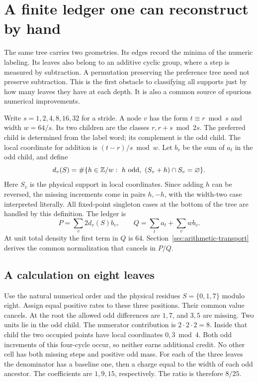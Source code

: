 \section{A finite ledger one can reconstruct by hand}
\label{sec:ledger}
The same tree carries two geometries. Its edges record the minima of the numeric labeling. Its leaves also belong to an additive cyclic group, where a step is measured by subtraction. A permutation preserving the preference tree need not preserve subtraction. This is the first obstacle to classifying all supports just by how many leaves they have at each depth. It is also a common source of spurious numerical improvements.

Write \(s=1,2,4,8,16,32\) for a stride. A node \(v\) has the form \(t\equiv r\bmod s\) and width \(w=64/s\). Its two children are the classes \(r,r+s\bmod 2s\). The preferred child is determined from the label word; its complement is the odd child. The local coordinate for addition is \((t-r)/s\bmod w\). Let \(b_v\) be the sum of \(a_t\) in the odd child, and define
\[
 d_v(S)=\#\{h\in\mathbb Z/w:\ h\ {\rm odd},\
                 (S_v+h)\cap S_v=\varnothing\}.
\]
Here \(S_v\) is the physical support in local coordinates. Since adding \(h\) can be reversed, the missing increments come in pairs \(h,-h\), with the width-two case interpreted literally. All fixed-point singleton cases at the bottom of the tree are handled by this definition. The ledger is
\[
 P=\sum_v 2d_v(S)b_v,\qquad Q=\sum_t a_t+\sum_v w b_v.
 \tag{L}\label{eq:ledger-basic}
\]
At unit total density the first term in \(Q\) is 64. Section~\ref{sec:arithmetic-transport} derives the common normalization that cancels in \(P/Q\).

\subsection{A calculation on eight leaves}
Use the natural numerical order and the physical residues \(S=\{0,1,7\}\) modulo eight. Assign equal positive rates to these three positions. Their common value cancels. At the root the allowed odd differences are \(1,7\), and \(3,5\) are missing. Two units lie in the odd child. The numerator contribution is \(2\cdot2\cdot2=8\). Inside that child the two occupied points have local coordinates \(0,3\bmod4\). Both odd increments of this four-cycle occur, so neither earns additional credit. No other cell has both missing steps and positive odd mass. For each of the three leaves the denominator has a baseline one, then a charge equal to the width of each odd ancestor. The coefficients are \(1,9,15\), respectively. The ratio is therefore \(8/25\).

